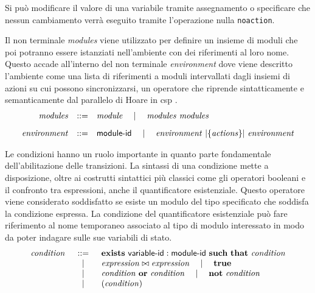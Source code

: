 Si può modificare il valore di una variabile tramite assegnamento o specificare che nessun cambiamento verrà eseguito tramite l'operazione nulla \texttt{noaction}.

Il non terminale \emph{modules} viene utilizzato per definire un insieme di moduli che poi potranno essere istanziati nell'ambiente con dei riferimenti al loro nome. Questo accade all'interno del non terminale \emph{environment} dove viene descritto l'ambiente come una lista di riferimenti a moduli intervallati dagli insiemi di azioni su cui possono sincronizzarsi, un operatore che riprende sintatticamente e semanticamente dal parallelo di Hoare in \ac{csp} \cite{Hoare:1978:CSP}.
$$
\begin{array}{rcl}
	\mathit{modules} &::=& \mathit{module} \quad\mid\quad \mathit{modules} \mbox{ } \mathit{modules}
		\\[.3cm]
	\mathit{environment} &::=& {\sf module}\textrm{-}{\sf id} \quad\mid\quad \mathit{environment} \mbox{ }|{\{\mathit{actions}\}}|\mbox{ } \mathit{environment}
		\\
\end{array}
$$

Le condizioni hanno un ruolo importante in quanto parte fondamentale dell'abilitazione delle transizioni. La sintassi di una condizione mette a disposizione, oltre ai costrutti sintattici più classici come gli operatori booleani e il confronto tra espressioni, anche il quantificatore esistenziale. Questo operatore viene considerato soddisfatto se esiste un modulo del tipo specificato che soddisfa la condizione espressa. La condizione del quantificatore esistenziale può fare riferimento al nome temporaneo associato al tipo di modulo interessato in modo da poter indagare sulle sue variabili di stato.
$$
\begin{array}{rcl}
	\mathit{condition} &::=& \mathbf{exists} \mbox{ } {\sf variable}\textrm{-}{\sf id}:{\sf module}\textrm{-}{\sf id} \mbox{ } \mathbf{such}\mbox{ }\mathbf{that} \mbox{ } \mathit{condition} \\
		& \quad\mid\quad & \mathit{expression} \bowtie \mathit{expression} \quad\mid\quad \mathbf{true} \\
		& \quad\mid\quad & \mathit{condition} \mbox{ } \mathbf{or} \mbox{ } \mathit{condition} \quad\mid\quad \mathbf{not} \mbox{ } \mathit{condition} \\
		& \quad\mid\quad & (\mathit{condition})
		\\
\end{array}
$$

